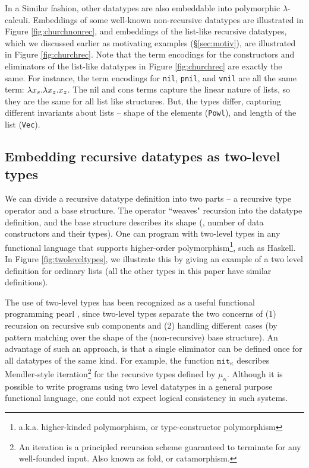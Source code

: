 In a Similar fashion, other datatypes are also embeddable into
polymorphic $\lambda$-calculi.
Embeddings of some well-known non-recursive datatypes are illustrated
in Figure \ref{fig:churchnonrec}, and embeddings of the list-like
recursive datatypes, which we discussed earlier as motivating examples
(\S\ref{sec:motiv}), are illustrated in Figure \ref{fig:churchrec}.
Note that the term encodings for the constructors and eliminators of
the list-like datatypes in Figure \ref{fig:churchrec} are exactly the same.
For instance, the term encodings for \texttt{nil}, \texttt{pnil}, and
\texttt{vnil} are all the same term: $\lambda x_s.\lambda x_z.x_z$. The nil and cons terms
capture the linear nature of lists, so they are the same for all list like structures.
But, the types differ, capturing different invariants about lists -- shape of the elements ({\tt Powl}), and
length of the list ({\tt Vec}).

\subsection{Embedding recursive datatypes as two-level types}
\label{ssec:embedTwoLevel}
We can divide a recursive datatype definition into two parts --
a recursive type operator and a base structure. The operator ``weaves" recursion
into the datatype definition, and the base structure describes
its shape (\ie, number of data constructors and their types).
One can program with two-level types in any functional language that supports
higher-order polymorphism\footnote{a.k.a. higher-kinded polymorphism,
	or type-constructor polymorphism}, such as Haskell. 
In Figure \ref{fig:twoleveltypes}, we illustrate this by giving an example of a two level definition
for ordinary lists (all the other types in this paper have similar definitions).

The use of two-level types has been recognized as
a useful functional programming pearl \cite{Sheard04}, since two-level types
separate the two concerns of (1) recursion on recursive sub components
and (2) handling different cases (by pattern matching over the shape of the (non-recursive) base structure).
An advantage of such an approach, is that a single eliminator can be defined once for
all datatypes of the same kind. For example, the function $\mathtt{mit}_\kappa$ describes
Mendler-style iteration\footnote{An iteration is a principled recursion
	scheme guaranteed to terminate for any well-founded input.
	Also known as fold, or catamorphism.} for the recursive types
defined by $\mu_\kappa$. Although it is possible to write programs using two level datatypes
in a general purpose functional language, one could
not expect logical consistency in such systems.


